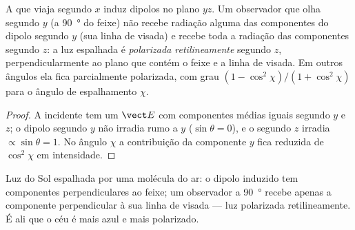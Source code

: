 \begin{proposition}\label{prop:b2:dipole-radiation:polarization}
A  que viaja segundo $x$ induz dipolos no plano $yz$.
Um observador que olha segundo $y$ (a \qty{90}{\degree} do feixe) não recebe
radiação alguma das componentes do dipolo segundo $y$ (sua linha de visada)
e recebe toda a radiação das componentes segundo $z$: a luz espalhada é
\emph{polarizada retilineamente} segundo $z$, perpendicularmente ao plano
que contém o feixe e a linha de visada. Em outros ângulos ela fica
parcialmente polarizada, com grau $(1 - \cos^2\chi)/(1 + \cos^2\chi)$ para
o ângulo de espalhamento $\chi$.
\end{proposition}

\begin{proof}
A  incidente tem um $\vect E$ com componentes médias iguais
segundo $y$ e $z$; o dipolo segundo $y$ não irradia rumo a $y$ ($\sin
\theta = 0$), e o segundo $z$ irradia $\propto\sin\theta = 1$. No ângulo $\chi$
a contribuição da componente $y$ fica reduzida de $\cos^2\chi$ em intensidade.
\end{proof}

\begin{omfigure}

{\small Luz do Sol espalhada por uma molécula do ar: o dipolo induzido tem
componentes perpendiculares ao feixe; um observador a \qty{90}{\degree}
recebe apenas a componente perpendicular à sua linha de visada ---
luz polarizada retilineamente. É ali que o céu é mais azul e mais polarizado.}
\end{omfigure}

